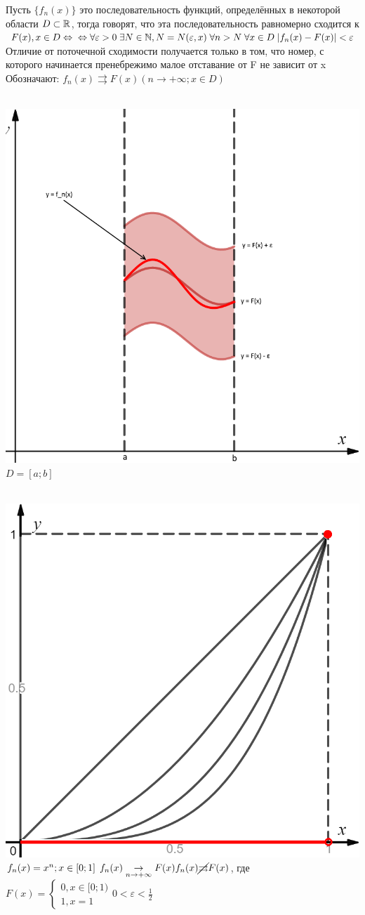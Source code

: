 \begin{Def}
	Пусть $\{f_n(x)\}$ это последовательность функций, определённых в некоторой области $D \subset \mathbb{R}$, тогда говорят, что эта последовательность равномерно сходится к $F(x), x \in D \Leftrightarrow \\
	\Leftrightarrow \forall \varepsilon > 0 \; \exists N \in \mathbb{N}, N=N(\varepsilon, x) \; \forall n > N \; \forall x \in D \; |f_n(x) - F(x)| < \varepsilon$
	Отличие от поточечной сходимости получается только в том, что номер, с которого начинается пренебрежимо малое отставание от F не зависит от x\\
	Обозначают: $f_n(x) \rightrightarrows F(x) (n \to +\infty; x \in D)$
\end{Def}

\begin{Note}
	~\\
	\includegraphics[width=0.5\linewidth]{pictures/4_1_3.png} $D = [a;b]$
\end{Note}

\begin{Note}
	~\\
	\includegraphics[width=0.5\linewidth]{pictures/4_1_4.png}\\
	$f_n(x) = x^n; x \in [0;1] \: \: f_n(x) \underset{n \to +\infty}{\rightarrow}F(x) \\
	f_n(x) \cancel{\rightrightarrows} F(x)$, где $F(x) = 
	\begin{cases}
	0, x \in [0;1)\\
	1, x = 1
	\end{cases} 0 < \varepsilon < \frac{1}{2}$
\end{Note}

